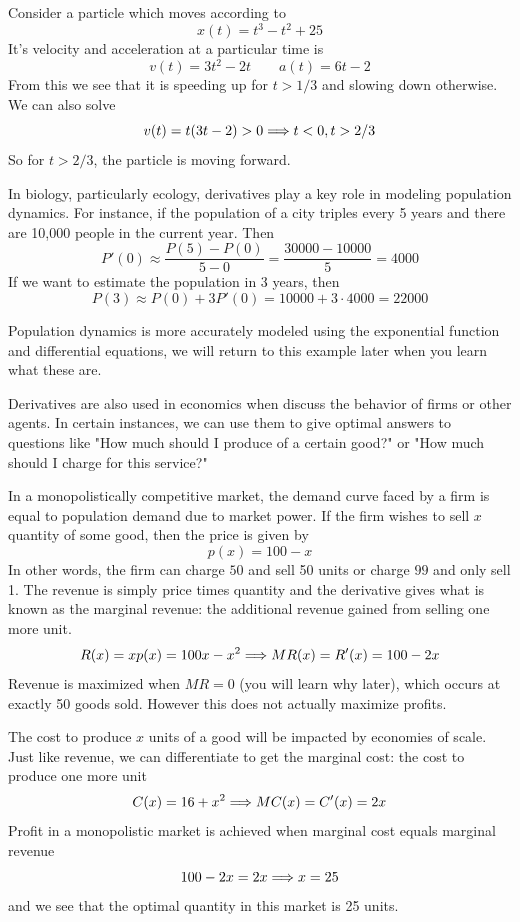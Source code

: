 \begin{example}
	Consider a particle which moves according to
	\[ x(t) = t^3 - t^2 + 25 \]
	It's velocity and acceleration at a particular time is 
	\[ v(t) = 3t^2 - 2t \qquad a(t) = 6t - 2 \]
	From this we see that it is speeding up for $t > 1/3$ and slowing down otherwise. We can also solve
	\[ v(t) = t(3t - 2) > 0 \Longrightarrow t < 0, t > 2/3 \]
	So for $t > 2/3$, the particle is moving forward.
\end{example}

In biology, particularly ecology, derivatives play a key role in modeling population dynamics. For instance, if the population of a city triples every 5 years and there are 10,000 people in the current year. Then
\[ P'(0) \approx \frac{P(5) - P(0)}{5 - 0} = \frac{30000 - 10000}{5} = 4000 \]
If we want to estimate the population in 3 years, then
\[ P(3) \approx P(0) + 3P'(0) = 10000 + 3 \cdot 4000 = 22000 \]

Population dynamics is more accurately modeled using the exponential function and differential equations, we will return to this example later when you learn what these are.

Derivatives are also used in economics when discuss the behavior of firms or other agents. In certain instances, we can use them to give optimal answers to questions like "How much should I produce of a certain good?" or "How much should I charge for this service?" 

\begin{example}
	In a monopolistically competitive market, the demand curve faced by a firm is equal to population demand due to market power. If the firm wishes to sell $x$ quantity of some good, then the price is given by
	\[ p(x) = 100 - x \]
	In other words, the firm can charge $50$ and sell 50 units or charge $99$ and only sell 1. The revenue is simply price times quantity and the derivative gives what is known as the marginal revenue: the additional revenue gained from selling one more unit.
	\[ R(x) = x p(x) = 100 x - x^2 \Longrightarrow MR(x) = R'(x) = 100 - 2x \]
	Revenue is maximized when $MR = 0$ (you will learn why later), which occurs at exactly 50 goods sold. However this does not actually maximize profits.
	
	The cost to produce $x$ units of a good will be impacted by economies of scale. Just like revenue, we can differentiate to get the marginal cost: the cost to produce one more unit
	\[ C(x) = 16 + x^2 \Longrightarrow MC(x) = C'(x) = 2x \]
	Profit in a monopolistic market is achieved when marginal cost equals marginal revenue
	\[ 100 - 2x = 2x \Longrightarrow x = 25 \]
	and we see that the optimal quantity in this market is 25 units.
\end{example}

